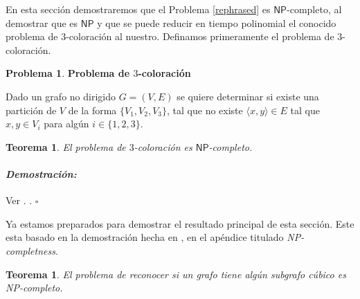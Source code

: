 \documentclass[10pt]{amsart}
\newtheorem{teo}[theorem]{Teorema}
\theoremstyle{definition}
\newtheorem{prob}[theorem]{Problema}
\numberwithin{equation}{section}
\newenvironment{myproof} {\paragraph{\emph{Demostraci\'on:}}}{\hfill$\square$}
\newcommand{\edge}[1]{\langle #1\rangle}
\begin{document}
En esta secci\'on demostraremos que el Problema \ref{rephrased} es $\mathsf{NP}$-completo, al demostrar que es $\mathsf{NP}$ y que se puede reducir en tiempo polinomial el conocido problema de $3$-coloraci\'on al nuestro. Definamos primeramente el problema de $3$-coloraci\'on.

	\begin{prob} \textbf{Problema de $3$-coloraci\'on}
		
		Dado un grafo no dirigido $G = (V,E)$ se quiere determinar si existe una partici\'on de $V$ de la forma $\{V_1, V_2, V_3\}$, tal que no existe $\edge{x,y} \in E$ tal que $x,y \in V_i$ para alg\'un $i \in \{1,2,3\}$.
		
	\end{prob}

\begin{teo}
	El problema de $3$-coloraci\'on es $\mathsf{NP}$-completo.
\end{teo}

\begin{myproof}
	Ver \cite{3-color}. .
\end{myproof}
	
	Ya estamos preparados para demostrar el resultado principal de esta secci\'on. Este esta basado en la demostraci\'on hecha en \cite{trsfrg}, en el ap\'endice titulado \emph{NP-completness}. 

\begin{teo}
	El problema de reconocer si un grafo tiene alg\'un subgrafo c\'ubico es NP-completo.
\end{teo}
\end{document}
